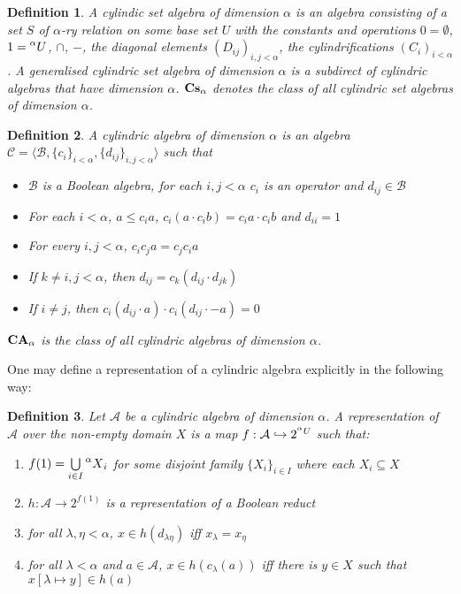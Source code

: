 \documentclass[a4paper]{article}
\theoremstyle{defin}
\newtheorem{defin}{Definition}
\theoremstyle{theorem}
\theoremstyle{prop}
\theoremstyle{lemma}
\theoremstyle{fact}
\theoremstyle{ex}
\theoremstyle{col}
\begin{document}
\begin{defin}
 A cylindic set algebra of dimension $\alpha$ is an algebra consisting of a set $S$ of $\alpha$-ry relation on some base set $U$
   with the constants and operations $0 = \emptyset$, $1 = \prescript{\alpha}{}U$, $\cap$, $-$, the diagonal elements $(D_{ij})_{i, j < \alpha}$, the cylindrifications $(C_i)_{i < \alpha}$. A generalised cylindric set algebra of dimension $\alpha$ is a subdirect of cylindric algebras that have dimension $\alpha$.
   ${\bf Cs}_{\alpha}$ denotes the class of all cylindric set algebras of dimension $\alpha$.
\end{defin}

\begin{defin}
   A cylindric algebra of dimension $\alpha$ is an algebra $\mathcal{C} = \langle \mathcal{B}, \{ c_i \}_{i < \alpha}, \{ d_{ij} \}_{i, j < \alpha} \rangle$ such that
   \begin{itemize}
     \item $\mathcal{B}$ is a Boolean algebra, for each $i, j < \alpha$ $c_i$ is an operator and $d_{ij} \in \mathcal{B}$
     \item For each $i < \alpha$, $a \leq c_i a$, $c_i (a \cdot c_i b) = c_i a \cdot c_i b$ and $d_{ii} = 1$
     \item For every $i, j < \alpha$, $c_i c_j a = c_j c_i a$
     \item If $k \neq i, j < \alpha$, then $d_{ij} = c_k (d_{ij} \cdot d_{jk})$
     \item If $i \neq j$, then $c_i (d_{ij} \cdot a) \cdot c_i (d_{ij} \cdot - a) = 0$
   \end{itemize}
   ${\bf CA}_{\alpha}$ is the class of all cylindric algebras of dimension $\alpha$.
\end{defin}

One may define a representation of a cylindric algebra explicitly in the following way:

\begin{defin}
 Let $\mathcal{A}$ be a cylindric algebra of dimension $\alpha$. A representation of $\mathcal{A}$ over the non-empty domain $X$ is a map $f : \mathcal{A} \hookrightarrow 2^{\prescript{\alpha}{}U}$ such that:
 \begin{enumerate}
   \item $f(1) = \bigcup \limits_{i \in I} \prescript{\alpha}{}X_i$ for some disjoint family $\{X_i\}_{i \in I}$ where each $X_i \subseteq X$
   \item $h : \mathcal{A} \to 2^{f(1)}$ is a representation of a Boolean reduct
   \item for all $\lambda, \eta < \alpha$, $x \in h(d_{\lambda \eta})$ iff $x_{\lambda} = x_{\eta}$
   \item for all $\lambda < \alpha$ and $a \in \mathcal{A}$, $x \in h(c_{\lambda}(a))$ iff there is $y \in X$ such that $x[\lambda \mapsto y] \in h(a)$
 \end{enumerate}
\end{defin}
\end{document}
